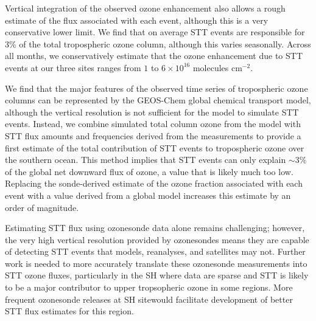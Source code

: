Vertical integration of the observed ozone enhancement also allows a rough estimate of the flux associated with each event, although this is a very conservative lower limit.
We find that on average STT events are responsible for 3\% of the total tropospheric ozone column, although this varies seasonally.
Across all months, we conservatively estimate that the ozone enhancement due to STT events at our three sites ranges from $1$ to $6 \times 10^{16}$ molecules cm$^{-2}$.


We find that the major features of the observed time series of tropospheric ozone columns can be represented by the GEOS-Chem global chemical transport model, although the vertical resolution is not sufficient for the model to simulate STT events. 
Instead, we combine simulated total column ozone from the model with STT flux amounts and frequencies derived from the measurements to provide a first estimate of the total contribution of STT events to tropospheric ozone over the southern ocean.
This method implies that STT events can only explain $\sim$3\% of the global net downward flux of ozone, a value that is likely much too low. 
Replacing the sonde-derived estimate of the ozone fraction associated with each event with a value derived from a global model \citep{Terao2008} increases this estimate by an order of magnitude.

Estimating STT flux using ozonesonde data alone remains challenging; however, the very high vertical resolution provided by ozonesondes means they are capable of detecting STT events that models, reanalyses, and satellites may not. 
Further work is needed to more accurately translate these ozonesonde measurements into STT ozone fluxes, particularly in the SH where data are sparse and STT is likely to be a major contributor to upper tropsopheric ozone in some regions.
More frequent ozonesonde releases at SH sitewould facilitate development of better STT flux estimates for this region.



